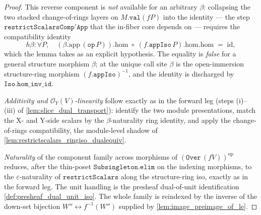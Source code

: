 \begin{proof}
  This reverse component is \emph{not} available for an arbitrary \(\beta\): collapsing the two
  stacked change-of-rings layers on \(M.\mathtt{val}(fP)\) into the identity --- the step
  \(\mathtt{restrictScalarsComp'App}\) that the in-fiber core depends on --- requires the
  compatibility identity
  \[
    h\beta : \forall P,\quad
      (\beta.\mathrm{app}\,(\mathtt{op}\,P)).\mathrm{hom}
        \;\circ\;
      (f.\mathtt{appIso}\,P).\mathrm{hom}.\mathrm{hom}
        \;=\;
      \mathrm{id},
  \]
  which the lemma takes as an explicit hypothesis. The equality is \emph{false} for a general
  structure morphism \(\beta\); at the unique call site \(\beta\) is the open-immersion
  structure-ring morphism \((f.\mathtt{appIso})^{-1}\), and the identity is discharged by
  \(\mathtt{Iso.hom\_inv\_id}\).

  \emph{Additivity and \(\mathcal{O}_Y(V)\)-linearity} follow exactly as in the forward leg
  (steps (i)--(iii) of \cref{lem:slice_dual_transport}): identify the two module
  presentations, match the X- and Y-side scalars by the \(\beta\)-naturality ring identity,
  and apply the change-of-rings compatibility, the module-level shadow of
  \cref{lem:restrictscalars_ringiso_dualequiv}.

  \emph{Naturality} of the component family across morphisms of \((\mathtt{Over}\,(fV))^{\mathrm{op}}\)
  reduces, after the thin-poset \(\mathtt{Subsingleton.elim}\) on the indexing morphisms, to
  the \(\varepsilon\)-naturality of \(\mathtt{restrictScalars}\) along the structure-ring iso,
  exactly as in the forward leg. The unit handling is the presheaf dual-of-unit
  identification \cref{def:presheaf_dual_unit_iso}. The whole family is reindexed by the
  inverse of the down-set bijection \(W'' \leftrightarrow f^{-1}(W'')\) supplied by
  \cref{lem:image_preimage_of_le}.
\end{proof}

